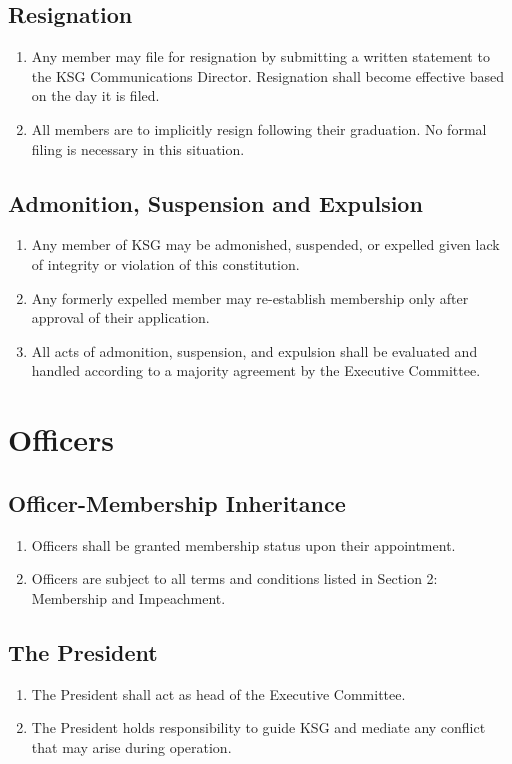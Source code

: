 \documentclass[12pt,executivepaper]{article}
\begin{document}
\subsection{Resignation}
\begin{enumerate}
    \item Any member may file for resignation by submitting a written statement to
          the KSG Communications Director. Resignation shall become effective based
          on the day it is filed.
    \item All members are to implicitly resign following their graduation. No
          formal filing is necessary in this situation.
\end{enumerate}

\subsection{Admonition, Suspension and Expulsion}
\begin{enumerate}
    \item Any member of KSG may be admonished, suspended, or expelled given lack of
          integrity or violation of this constitution.
    \item Any formerly expelled member may re-establish membership only after
          approval of their application.
    \item All acts of admonition, suspension, and expulsion shall be evaluated
          and handled according to a majority agreement by the Executive
          Committee.
\end{enumerate}

\section{Officers}

\subsection{Officer-Membership Inheritance}
\begin{enumerate}
    \item Officers shall be granted membership status upon their appointment.
    \item Officers are subject to all terms and conditions listed in Section 2:
          Membership and Impeachment.
\end{enumerate}

\subsection{The President}
\begin{enumerate}
    \item The President shall act as head of the Executive Committee.
    \item The President holds responsibility to guide KSG and mediate any conflict
          that may arise during operation.
\end{enumerate}
\end{document}
